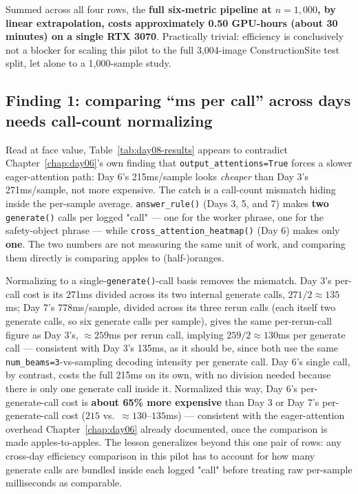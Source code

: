 Summed across all four rows, the \textbf{full six-metric pipeline at $n=1{,}000$, by linear
extrapolation, costs approximately 0.50 GPU-hours (about 30 minutes) on a single RTX 3070}.
Practically trivial: efficiency is conclusively not a blocker for scaling this pilot to the full
3,004-image ConstructionSite test split, let alone to a 1,000-sample study.

\subsection{Finding 1: comparing ``ms per call'' across days needs call-count normalizing}

Read at face value, Table~\ref{tab:day08-results} appears to contradict
Chapter~\ref{chap:day06}'s own finding that \texttt{output\_attentions=True} forces a slower
eager-attention path: Day 6's 215ms/sample looks \emph{cheaper} than Day 3's 271ms/sample, not more
expensive. The catch is a call-count mismatch hiding inside the per-sample average.
\texttt{answer\_rule()} (Days 3, 5, and 7) makes \textbf{two} \texttt{generate()} calls per logged
"call" --- one for the worker phrase, one for the safety-object phrase --- while
\texttt{cross\_attention\_heatmap()} (Day 6) makes only \textbf{one}. The two numbers are not
measuring the same unit of work, and comparing them directly is comparing apples to (half-)oranges.

Normalizing to a single-\texttt{generate()}-call basis removes the mismatch. Day 3's per-call cost
is its 271ms divided across its two internal generate calls, $271/2 \approx 135$ms; Day 7's
778ms/sample, divided across its three rerun calls (each itself two generate calls, so six generate
calls per sample), gives the same per-rerun-call figure as Day 3's, $\approx 259$ms per rerun call,
implying $259/2 \approx 130$ms per generate call --- consistent with Day 3's 135ms, as it should be,
since both use the same \texttt{num\_beams=3}-vs-sampling decoding intensity per generate call.
Day 6's single call, by contrast, costs the full 215ms on its own, with no division needed because
there is only one generate call inside it. Normalized this way, Day 6's per-generate-call cost is
\textbf{about 65\% more expensive} than Day 3 or Day 7's per-generate-call cost ($215$ vs.\
$\approx 130$--$135$ms) --- consistent with the eager-attention overhead Chapter~\ref{chap:day06}
already documented, once the comparison is made apples-to-apples. The lesson generalizes beyond this
one pair of rows: any cross-day efficiency comparison in this pilot has to account for how many
generate calls are bundled inside each logged "call" before treating raw per-sample milliseconds as
comparable.

